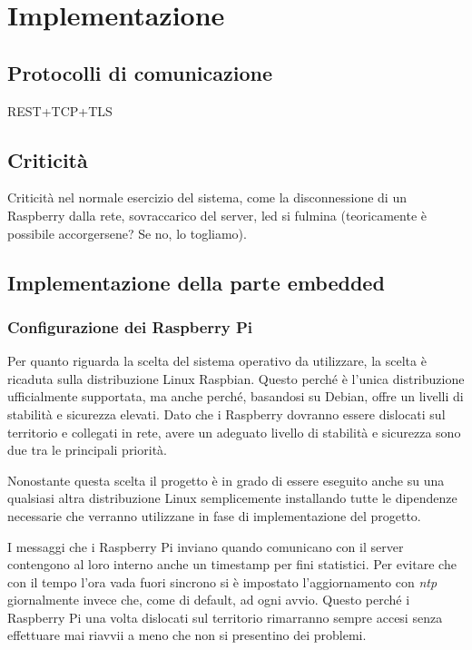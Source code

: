 \chapter{Implementazione}

\section{Protocolli di comunicazione}

REST+TCP+TLS

\section{Criticità}

Criticità nel normale esercizio del sistema, come la disconnessione di un Raspberry dalla rete, sovraccarico del server, led si fulmina (teoricamente è possibile accorgersene? Se no, lo togliamo).

\section{Implementazione della parte embedded}

\subsection{Configurazione dei Raspberry Pi}

Per quanto riguarda la scelta del sistema operativo da utilizzare, la scelta è ricaduta sulla distribuzione Linux Raspbian.
Questo perché è l'unica distribuzione ufficialmente supportata, ma anche perché, basandosi su Debian, offre un livelli di stabilità e sicurezza elevati.
Dato che i Raspberry dovranno essere dislocati sul territorio e collegati in rete, avere un adeguato livello di stabilità e sicurezza sono due tra le principali priorità.

Nonostante questa scelta il progetto è in grado di essere eseguito anche su una qualsiasi altra distribuzione Linux semplicemente installando tutte le dipendenze necessarie che verranno utilizzane in fase di implementazione del progetto.

I messaggi che i Raspberry Pi inviano quando comunicano con il server contengono al loro interno anche un timestamp per fini statistici.
Per evitare che con il tempo l'ora vada fuori sincrono si è impostato l'aggiornamento con \textit{ntp} giornalmente invece che, come di default, ad ogni avvio.
Questo perché i Raspberry Pi una volta dislocati sul territorio rimarranno sempre accesi senza effettuare mai riavvii a meno che non si presentino dei problemi.


